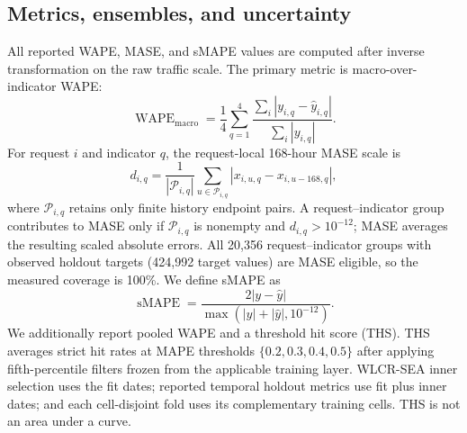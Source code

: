 \documentclass[10pt,conference,letterpaper]{IEEEtran}
\begin{document}
\subsection{Metrics, ensembles, and uncertainty}
All reported WAPE, MASE, and sMAPE values are computed after inverse transformation on the raw traffic scale. The primary metric is macro-over-indicator WAPE:
\begin{equation}
\operatorname{WAPE}_{\mathrm{macro}}=
\frac14\sum_{q=1}^{4}
\frac{\sum_i|y_{i,q}-\widehat y_{i,q}|}{\sum_i|y_{i,q}|}.
\end{equation}
For request $i$ and indicator $q$, the request-local 168-hour MASE scale is
\begin{equation}
d_{i,q}=\frac{1}{|\mathcal P_{i,q}|}\sum_{u\in\mathcal P_{i,q}}
|x_{i,u,q}-x_{i,u-168,q}|,
\end{equation}
where $\mathcal P_{i,q}$ retains only finite history endpoint pairs. A request--indicator group contributes to MASE only if $\mathcal P_{i,q}$ is nonempty and $d_{i,q}>10^{-12}$; MASE averages the resulting scaled absolute errors. All 20,356 request--indicator groups with observed holdout targets (424,992 target values) are MASE eligible, so the measured coverage is 100\%. We define sMAPE as
\begin{equation}
\operatorname{sMAPE}=\frac{2|y-\widehat y|}{\max(|y|+|\widehat y|,10^{-12})}.
\end{equation}
We additionally report pooled WAPE and a threshold hit score (THS). THS averages strict hit rates at MAPE thresholds $\{0.2,0.3,0.4,0.5\}$ after applying fifth-percentile filters frozen from the applicable training layer. WLCR-SEA inner selection uses the fit dates; reported temporal holdout metrics use fit plus inner dates; and each cell-disjoint fold uses its complementary training cells. THS is not an area under a curve.
\end{document}
